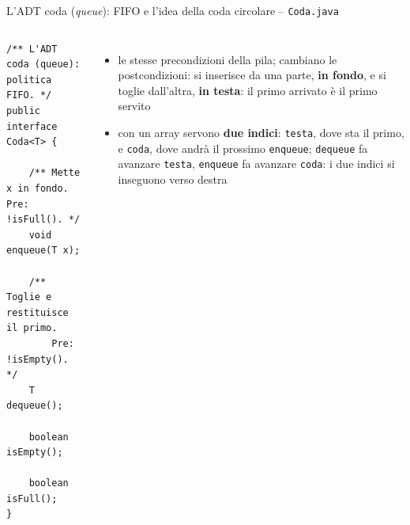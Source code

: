 \documentclass[10pt,aspectratio=169,xcolor={table}]{beamer}
\begin{document}
\begin{frame}[fragile]{L'ADT coda (\emph{queue}): FIFO e l'idea della coda circolare -- \texttt{Coda.java}}
\begin{columns}[T]
\begin{lstlisting}[basicstyle=\ttfamily\scriptsize]
/** L'ADT coda (queue): politica FIFO. */
public interface Coda<T> {

    /** Mette x in fondo. Pre: !isFull(). */
    void enqueue(T x);

    /** Toglie e restituisce il primo.
        Pre: !isEmpty(). */
    T dequeue();

    boolean isEmpty();

    boolean isFull();
}
\end{lstlisting}
\footnotesize
\begin{itemize}\itemsep=3pt
    \item le stesse precondizioni della pila; cambiano le postcondizioni: si inserisce da una parte, \textbf{in fondo}, e si toglie dall'altra, \textbf{in testa}: il primo arrivato è il primo servito
    \item con un array servono \textbf{due indici}: \texttt{testa}, dove sta il primo, e \texttt{coda}, dove andrà il prossimo \texttt{enqueue}; \texttt{dequeue} fa avanzare \texttt{testa}, \texttt{enqueue} fa avanzare \texttt{coda}: i due indici si inseguono verso destra
\end{itemize}


\end{columns}
\end{frame}
\end{document}
